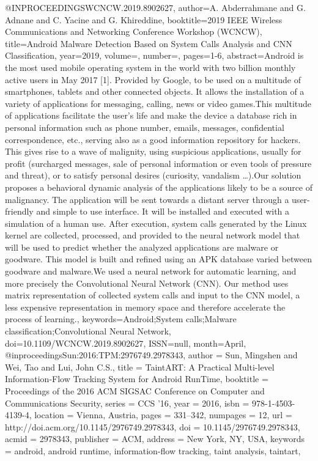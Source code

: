 @INPROCEEDINGS{WCNCW.2019.8902627, 
author={A. {Abderrahmane} and G. {Adnane} and C. {Yacine} and G. {Khireddine}}, 
booktitle={2019 IEEE Wireless Communications and Networking Conference Workshop (WCNCW)}, 
title={Android Malware Detection Based on System Calls Analysis and CNN Classification}, 
year={2019}, 
volume={}, 
number={}, 
pages={1-6}, 
abstract={Android is the most used mobile operating system in the world with two billion monthly active users in May 2017 [1]. Provided by Google, to be used on a multitude of smartphones, tablets and other connected objects. It allows the installation of a variety of applications for messaging, calling, news or video games.This multitude of applications facilitate the user’s life and make the device a database rich in personal information such as phone number, emails, messages, confidential correspondence, etc., serving also as a good information repository for hackers. This gives rise to a wave of malignity, using suspicious applications, usually for profit (surcharged messages, sale of personal information or even tools of pressure and threat), or to satisfy personal desires (curiosity, vandalism …).Our solution proposes a behavioral dynamic analysis of the applications likely to be a source of malignancy. The application will be sent towards a distant server through a user-friendly and simple to use interface. It will be installed and executed with a simulation of a human use. After execution, system calls generated by the Linux kernel are collected, processed, and provided to the neural network model that will be used to predict whether the analyzed applications are malware or goodware. This model is built and refined using an APK database varied between goodware and malware.We used a neural network for automatic learning, and more precisely the Convolutional Neural Network (CNN). Our method uses matrix representation of collected system calls and input to the CNN model, a less expensive representation in memory space and therefore accelerate the process of learning.}, 
keywords={Android;System calls;Malware classification;Convolutional Neural Network}, 
doi={10.1109/WCNCW.2019.8902627}, 
ISSN={null}, 
month={April},}
@inproceedings{Sun:2016:TPM:2976749.2978343,
 author = {Sun, Mingshen and Wei, Tao and Lui, John C.S.},
 title = {TaintART: A Practical Multi-level Information-Flow Tracking System for Android RunTime},
 booktitle = {Proceedings of the 2016 ACM SIGSAC Conference on Computer and Communications Security},
 series = {CCS '16},
 year = {2016},
 isbn = {978-1-4503-4139-4},
 location = {Vienna, Austria},
 pages = {331--342},
 numpages = {12},
 url = {http://doi.acm.org/10.1145/2976749.2978343},
 doi = {10.1145/2976749.2978343},
 acmid = {2978343},
 publisher = {ACM},
 address = {New York, NY, USA},
 keywords = {android, android runtime, information-flow tracking, taint analysis, taintart},
} 
